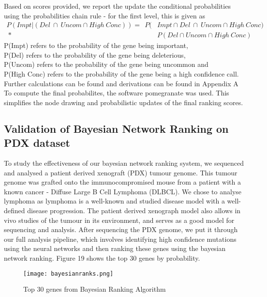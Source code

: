 \documentclass{article}
\begin{document}
Based on scores provided, we report the update the conditional probabilities using the probabilities chain rule - for the first level, this is given as \\
\begin{equation}
\begin{split}
P(Impt | (Del  \ \cap \ Uncom  \cap High\ Conc)) =  \ \ P(&Impt \cap Del  \ \cap \ Uncom \cap High \ Conc ) \\ \ * \ & P(Del  \cap Uncom  \cap High \ Conc )
\end{split}
\end{equation}
\tiny
\indent
P(Impt) refers to the probability of the gene being important,\\
\indent P(Del) refers to the probability of the gene being deleterious,\\ 
\indent P(Uncom) refers to the probability of the gene being uncommon and\\  \indent P(High Conc) refers to the probability of the gene being a high confidence call.\\ \indent Further calculations can be found and derivations can be found in Appendix A\\

\normalsize
\noindent
To compute the final probabilites, the software pomegranate was used. This simplifies the node drawing and probabilistic updates of the final ranking scores.
\subsection{Validation of Bayesian Network Ranking on PDX dataset}
To study the effectiveness of our bayesian network ranking system, we sequenced and analysed a patient derived xenograft (PDX) tumour genome. This tumour genome was grafted onto the immunocompromised mouse from a patient with a known cancer - Diffuse Large B Cell Lymphoma (DLBCL). We chose to analyse lymphoma as lymphoma is a well-known and studied disease model with a well-defined disease progression. The patient derived xenograph model also allows in vivo studies of the tumour in its environment, and serves as a good model for sequencing and analysis. After sequencing the PDX genome, we put it through our full analysis pipeline, which involves identifying high confidence mutations using the neural networks and then ranking these genes using the bayesian network ranking. Figure 19 shows the top 30 genes by probability. 

\begin{figure}[H]
\texttt{[image: bayesianranks.png]}
\caption{Top 30 genes from Bayesian Ranking Algorithm}
\centering
\end{figure}
\end{document}
